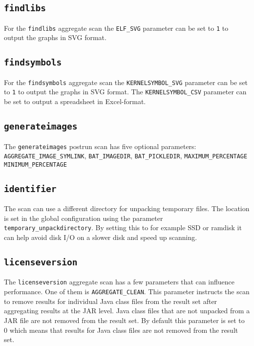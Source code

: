 \documentclass[10pt,a4paper]{article}
\begin{document}
\subsection{\texttt{findlibs}}

For the \texttt{findlibs} aggregate scan the \texttt{ELF\_SVG} parameter can be
set to \texttt{1} to output the graphs in SVG format.

\subsection{\texttt{findsymbols}}

For the \texttt{findsymbols} aggregate scan the \texttt{KERNELSYMBOL\_SVG}
parameter can be set to \texttt{1} to output the graphs in SVG format. The
\texttt{KERNELSYMBOL\_CSV} parameter can be set to output a spreadsheet in
Excel-format.

\subsection{\texttt{generateimages}}

The \texttt{generateimages} postrun scan has five optional parameters:
\texttt{AGGREGATE\_IMAGE\_SYMLINK}, \texttt{BAT\_IMAGEDIR}, \texttt{BAT\_PICKLEDIR}, \texttt{MAXIMUM\_PERCENTAGE}
\texttt{MINIMUM\_PERCENTAGE}

\subsection{\texttt{identifier}}

The scan can use a different directory for unpacking temporary files.
The location is set in the global configuration using the parameter
\texttt{temporary\_unpackdirectory}. By setting this to for example SSD or
ramdisk it can help avoid disk I/O on a slower disk and speed up scanning.

\subsection{\texttt{licenseversion}}

The \texttt{licenseversion} aggregate scan has a few parameters that can
influence performance. One of them is \texttt{AGGREGATE\_CLEAN}. This parameter
instructs the scan to remove results for individual Java class files from the
result set after aggregating results at the JAR level. Java class files that
are not unpacked from a JAR file are not removed from the result set. By
default this parameter is set to 0 which means that results for Java class
files are not removed from the result set.
\end{document}
